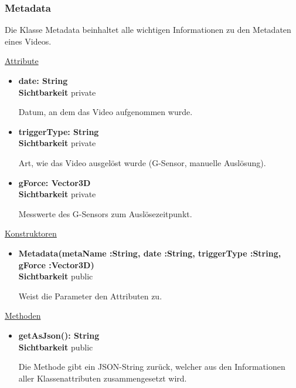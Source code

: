 \subsubsection{Metadata} \label{service:klasse:Metadata}
Die Klasse Metadata beinhaltet alle wichtigen Informationen zu den Metadaten eines Videos. \newline

\underline{Attribute}
\begin{itemize}
\itemsep0pt
\item \textbf{date: String} \hfill\\ 
\textbf{Sichtbarkeit} private 

Datum, an dem das Video aufgenommen wurde.

\item \textbf{triggerType: String} \hfill\\ 
\textbf{Sichtbarkeit} private 

Art, wie das Video ausgelöst wurde (G-Sensor, manuelle Auslösung). 

\item \textbf{gForce: Vector3D} \hfill\\ 
\textbf{Sichtbarkeit} private 

Messwerte des G-Sensors zum Auslösezeitpunkt.

\end{itemize}

\underline{Konstruktoren}
\begin{itemize}
\itemsep0pt
\item \textbf{Metadata(metaName :String, date :String, triggerType :String, gForce :Vector3D)} \hfill\\
\textbf{Sichtbarkeit} public 

Weist die Parameter den Attributen zu.

\end{itemize}

\underline{Methoden}
\begin{itemize}
\itemsep0pt
\item \textbf{getAsJson(): String}\hfill\\
\textbf{Sichtbarkeit} public 

Die Methode gibt ein JSON-String zurück, welcher aus den Informationen aller Klassenattributen zusammengesetzt wird.

\end{itemize}